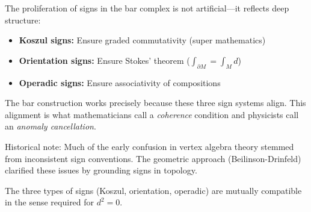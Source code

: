 \begin{remark}\label{rem:why-signs}
The proliferation of signs in the bar complex is not artificial—it reflects deep structure:

\begin{itemize}
\item \textbf{Koszul signs:} Ensure graded commutativity (super mathematics)
\item \textbf{Orientation signs:} Ensure Stokes' theorem ($\int_{\partial M} = \int_M d$)
\item \textbf{Operadic signs:} Ensure associativity of compositions
\end{itemize}

The bar construction works precisely because these three sign systems align. This alignment is what mathematicians call a \emph{coherence} condition and physicists call an \emph{anomaly cancellation}.

Historical note: Much of the early confusion in vertex algebra theory stemmed from inconsistent sign conventions. The geometric approach (Beilinson-Drinfeld) clarified these issues by grounding signs in topology.
\end{remark}

\begin{lemma}\label{lem:sign-compatibility}
The three types of signs (Koszul, orientation, operadic) are mutually compatible in the sense required for $d^2 = 0$.
\end{lemma}

